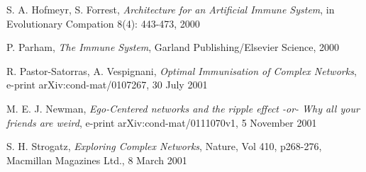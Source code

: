 \documentclass{article}
\begin{document}
\begin{thebibliography}{99}
S. A. Hofmeyr, S. Forrest, {\it Architecture for an Artificial Immune System}, in Evolutionary Compation 8(4): 443-473, 2000

P. Parham, {\it The Immune System}, Garland Publishing/Elsevier Science, 2000 

R. Pastor-Satorras, A. Vespignani, {\it Optimal Immunisation of Complex Networks}, e-print arXiv:cond-mat/0107267, 30 July 2001

M. E. J. Newman, {\it Ego-Centered networks and the ripple effect -or- Why all your friends are weird}, e-print arXiv:cond-mat/0111070v1, 5 November 2001

S. H. Strogatz, {\it Exploring Complex Networks}, Nature, Vol 410, p268-276, Macmillan Magazines Ltd., 8 March 2001

\end{thebibliography}
\end{document}
